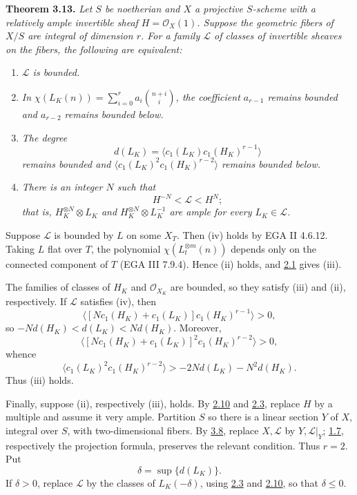 \textbf{Theorem 3.13.} \emph{Let \(S\) be noetherian and \(X\) a
projective \(S\)-scheme with a relatively ample invertible sheaf
\(H=\mathcal O_X(1)\). Suppose the geometric fibers of \(X/S\) are
integral of dimension \(r\). For a family \(\mathscr L\) of classes of
invertible sheaves on the fibers, the following are equivalent:}
\begin{enumerate}[label=(\roman*)]
\item \emph{\(\mathscr L\) is bounded.}
\item \emph{In
\(\chi(L_K(n))=\sum_{i=0}^{r}a_i\binom{n+i}{i}\),
the coefficient \(a_{r-1}\) remains bounded and \(a_{r-2}\) remains
bounded below.}
\item \emph{The degree
\[
d(L_K)=\langle c_1(L_K)c_1(H_K)^{r-1}\rangle
\]
remains bounded and
\(\langle c_1(L_K)^2c_1(H_K)^{r-2}\rangle\) remains bounded below.}
\item \emph{There is an integer \(N\) such that
\[
H^{-N}<\mathscr L<H^N;
\]
that is, \(H_K^{\otimes N}\otimes L_K\) and
\(H_K^{\otimes N}\otimes L_K^{-1}\) are ample for every
\(L_K\in\mathscr L\).}
\end{enumerate}

Suppose \(\mathscr L\) is bounded by \(L\) on some \(X_T\). Then (iv)
holds by EGA II 4.6.12. Taking \(L\) flat over \(T\), the polynomial
\(\chi(L_t^{\otimes m}(n))\) depends only on the connected component of
\(T\) (EGA III 7.9.4). Hence (ii) holds, and \hyperlink{sga6.e13.para.2-1}{2.1} gives (iii).

The families of classes of \(H_K\) and \(\mathcal O_{X_K}\) are bounded,
so they satisfy (iii) and (ii), respectively. If \(\mathscr L\) satisfies
(iv), then
\[
\langle[Nc_1(H_K)+c_1(L_K)]c_1(H_K)^{r-1}\rangle>0,
\]
so \(-Nd(H_K)<d(L_K)<Nd(H_K)\). Moreover,
\[
\langle[Nc_1(H_K)+c_1(L_K)]^2c_1(H_K)^{r-2}\rangle>0,
\]
whence
\[
\langle c_1(L_K)^2c_1(H_K)^{r-2}\rangle
>-2Nd(L_K)-N^2d(H_K).
\]
Thus (iii) holds.

Finally, suppose (ii), respectively (iii), holds. By \hyperlink{sga6.e13.rem.2-10}{2.10} and \hyperlink{sga6.e13.lem.2-3}{2.3},
replace \(H\) by a multiple and assume it very ample. Partition \(S\) so
there is a linear section \(Y\) of \(X\), integral over \(S\), with
two-dimensional fibers. By \hyperlink{sga6.e13.thm.3-8}{3.8}, replace \(X,\mathscr L\) by
\(Y,\mathscr L|_Y\); \hyperlink{sga6.e13.lem.1-7}{1.7}, respectively the projection formula, preserves
the relevant condition. Thus \(r=2\). Put
\[
\delta=\sup\{d(L_K)\}.
\]
If \(\delta>0\), replace \(\mathscr L\) by the classes of
\(L_K(-\delta)\), using \hyperlink{sga6.e13.lem.2-3}{2.3} and \hyperlink{sga6.e13.rem.2-10}{2.10}, so that \(\delta\le0\).

